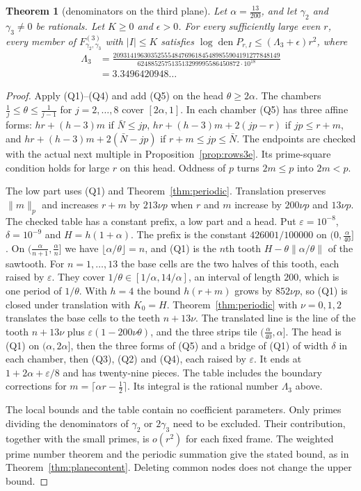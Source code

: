 \documentclass[11pt]{amsart}
\newtheorem{theorem}{Theorem}[section]
\theoremstyle{definition}
\theoremstyle{remark}
\numberwithin{equation}{section}
\newcommand{\den}{\operatorname{den}}
\begin{document}
\begin{theorem}[denominators on the third plane]\label{thm:content3}
Let $\alpha=\frac{13}{200}$, and let $\gamma_2$ and $\gamma_3\ne0$ be rationals. Let $K\ge0$ and $\epsilon>0$.
For every sufficiently large even $r$, every member of $F^{(3)}_{\gamma_2,\gamma_3}$ with $|I|\le K$ satisfies
$\log\den P_{r,I}\le(\Lambda_3+\epsilon)r^2$, where
\[
 \begin{aligned}
 \Lambda_3&=\frac{2093141963035255548476961845489855904191277848149}{624885257513513299995586450872\cdot10^{18}}\\
 &=3.3496420948\ldots
 \end{aligned}
\]
\end{theorem}
\begin{proof}
Apply (Q1)--(Q4) and add (Q5) on the head $\theta\ge2\alpha$.
The chambers $\frac1j\le\theta\le\frac1{j-1}$ for $j=2,\dots,8$ cover $[2\alpha,1]$.
In each chamber (Q5) has three affine forms: $hr+(h-3)m$ if $\bar N\le jp$,
$hr+(h-3)m+2(jp-r)$ if $jp\le r+m$, and $hr+(h-3)m+2(\bar N-jp)$ if $r+m\le jp\le\bar N$.
The endpoints are checked with the actual next multiple in Proposition~\ref{prop:rows3e}.
Its prime-square condition holds for large $r$ on this head. Oddness of $p$ turns $2m\le p$ into $2m<p$.

The low part uses (Q1) and Theorem~\ref{thm:periodic}. Translation preserves $\|m\|_p$ and increases $r+m$ by
$213\nu p$ when $r$ and $m$ increase by $200\nu p$ and $13\nu p$.
The checked table has a constant prefix, a low part and a head. Put $\varepsilon=10^{-8}$, $\delta=10^{-9}$ and
$H=h(1+\alpha)$. The prefix is the constant $426001/100000$ on $(0,\frac\alpha{40}]$. On $(\frac\alpha{n+1},\frac\alpha n]$ we have
$\lfloor\alpha/\theta\rfloor=n$, and (Q1) is the $n$th tooth $H-\theta\|\alpha/\theta\|$ of the sawtooth. For $n=1,\dots,13$ the base
cells are the two halves of this tooth, each raised by $\varepsilon$. They cover $1/\theta\in[1/\alpha,14/\alpha]$, an
interval of length $200$, which is one period of $1/\theta$. With $h=4$ the bound $h(r+m)$ grows by $852\nu p$, so (Q1)
is closed under translation with $K_0=H$. Theorem~\ref{thm:periodic} with $\nu=0,1,2$ translates the base cells to the
teeth $n+13\nu$. The translated line is the line of the
tooth $n+13\nu$ plus $\varepsilon(1-200\nu\theta)$, and the three strips tile $(\frac\alpha{40},\alpha]$. The head is
(Q1) on $(\alpha,2\alpha]$, then the three forms of (Q5) and a bridge of (Q1) of width $\delta$ in each chamber, then
(Q3), (Q2) and (Q4), each raised by $\varepsilon$. It ends at $1+2\alpha+\varepsilon/8$ and has twenty-nine pieces.
The table includes the boundary corrections for $m=\lceil\alpha r-\frac12\rceil$. Its integral is the rational number
$\Lambda_3$ above.

The local bounds and the table contain no coefficient parameters. Only primes dividing the denominators of
$\gamma_2$ or $2\gamma_3$ need to be excluded. Their contribution, together with the small primes, is $o(r^2)$
for each fixed frame. The weighted prime number theorem and the periodic summation give the stated bound,
as in Theorem~\ref{thm:planecontent}. Deleting common nodes does not change the upper bound.
\end{proof}
\end{document}
